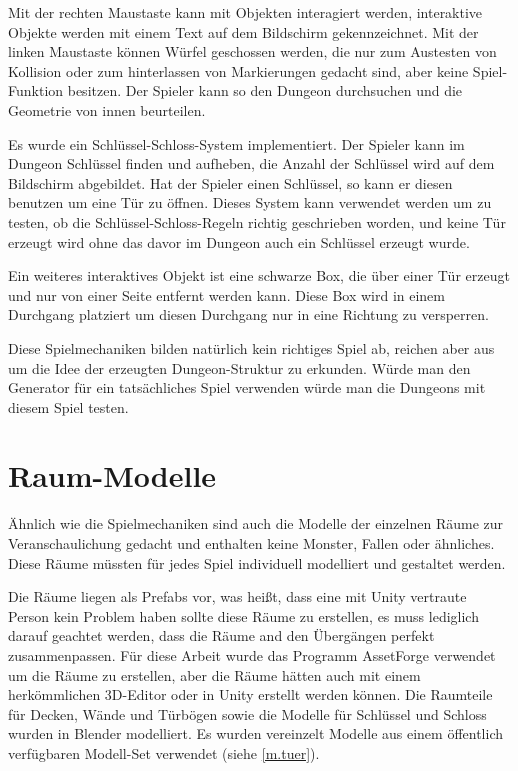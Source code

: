 Mit der rechten Maustaste kann mit Objekten interagiert werden, interaktive Objekte werden mit einem Text auf dem Bildschirm gekennzeichnet. Mit der linken Maustaste können Würfel geschossen werden, die nur zum Austesten von Kollision oder zum hinterlassen von Markierungen gedacht sind, aber keine Spiel-Funktion besitzen. Der Spieler kann so den Dungeon durchsuchen und die Geometrie von innen beurteilen. 

Es wurde ein Schlüssel-Schloss-System implementiert. Der Spieler kann im Dungeon Schlüssel finden und aufheben, die Anzahl der Schlüssel wird auf dem Bildschirm abgebildet. Hat der Spieler einen Schlüssel, so kann er diesen benutzen um eine Tür zu öffnen. Dieses System kann verwendet werden um zu testen, ob die Schlüssel-Schloss-Regeln richtig geschrieben worden, und keine Tür erzeugt wird ohne das davor im Dungeon auch ein Schlüssel erzeugt wurde.

Ein weiteres interaktives Objekt ist eine schwarze Box, die über einer Tür erzeugt und nur von einer Seite entfernt werden kann. Diese Box wird in einem Durchgang platziert um diesen Durchgang nur in eine Richtung zu versperren.

Diese Spielmechaniken bilden natürlich kein richtiges Spiel ab, reichen aber aus um die Idee der erzeugten Dungeon-Struktur zu erkunden. Würde man den Generator für ein tatsächliches Spiel verwenden würde man die Dungeons mit diesem Spiel testen.

\section{Raum-Modelle}

Ähnlich wie die Spielmechaniken sind auch die Modelle der einzelnen Räume zur Veranschaulichung gedacht und enthalten keine Monster, Fallen oder ähnliches. Diese Räume müssten für jedes Spiel individuell modelliert und gestaltet werden. 

Die Räume liegen als Prefabs vor, was heißt, dass eine mit Unity vertraute Person kein Problem haben sollte diese Räume zu erstellen, es muss lediglich darauf geachtet werden, dass die Räume and den Übergängen perfekt zusammenpassen. Für diese Arbeit wurde das Programm AssetForge verwendet um die Räume zu erstellen, aber die Räume hätten auch mit einem herkömmlichen 3D-Editor oder in Unity erstellt werden können. Die Raumteile für Decken, Wände und Türbögen sowie die Modelle für Schlüssel und Schloss wurden in Blender modelliert. Es wurden vereinzelt Modelle aus einem öffentlich verfügbaren Modell-Set verwendet (siehe \ref{m.tuer}).

